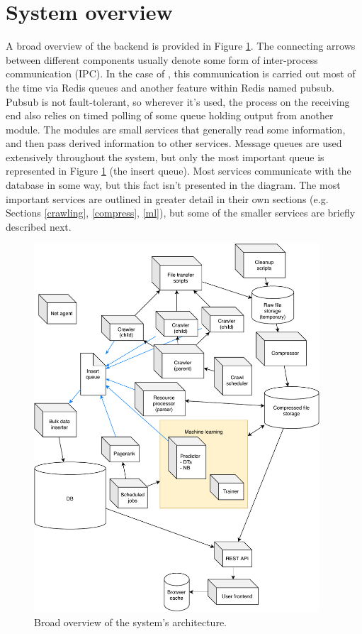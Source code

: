 \section{System overview\label{overview}}

A broad overview of the \nr{} backend is provided in Figure
\ref{overview-fig}.  The connecting arrows between different components
usually denote some form of inter-process communication (IPC).  In the
case of \nr{}, this communication is carried out most of the time via
Redis queues and another feature within Redis named pubsub.  Pubsub
is not fault-tolerant, so wherever it's used, the process on
the receiving end also relies on timed polling of some queue holding
output from another module.  The modules are small services that
generally read some information, and then pass derived information to
other services.  Message queues are used extensively
throughout the system, but only the most important queue is represented
in Figure \ref{overview-fig} (the insert queue).  Most services
communicate with the database in some way, but this fact isn't
presented in the diagram.
The most important services
are outlined in greater detail in their own sections
(e.g. Sections \ref{crawling}, \ref{compress}, \ref{ml}), but some
of the smaller services are briefly described next.

\begin{figure}
    \centering
    \includegraphics[width=0.95\textwidth]{media/system}
    \caption{
        Broad overview of the system's
        architecture.\label{overview-fig}
    }
\end{figure}


